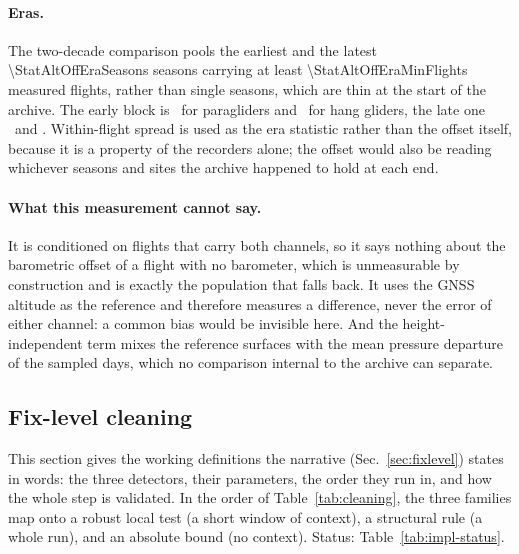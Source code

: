 \begin{revblock}
\paragraph{Eras.} The two-decade comparison pools the earliest and the latest
\num{\StatAltOffEraSeasons} seasons carrying at least
\num{\StatAltOffEraMinFlights} measured flights, rather than single seasons, which
are thin at the start of the archive. The early block is
\StatAltOffParaEraEarlyLabel\ for paragliders and \StatAltOffHangEraEarlyLabel\ for hang
gliders, the late one \StatAltOffParaEraLateLabel\ and \StatAltOffHangEraLateLabel.
Within-flight spread is used as the era statistic rather than the offset itself, because
it is a property of the recorders alone; the offset would also be reading whichever
seasons and sites the archive happened to hold at each end.

\paragraph{What this measurement cannot say.} It is conditioned on flights that carry
both channels, so it says nothing about the barometric offset of a flight with no
barometer, which is unmeasurable by construction and is exactly the population that falls
back. It uses the GNSS altitude as the reference and therefore measures a difference,
never the error of either channel: a common bias would be invisible here. And the
height-independent term mixes the reference surfaces with the mean pressure departure of
the sampled days, which no comparison internal to the archive can separate.
\end{revblock}

\subsection{Fix-level cleaning}
\label{impl:fixlevel}

This section gives the working definitions the narrative (Sec.~\ref{sec:fixlevel}) states in
words: the three detectors, their parameters, the order they run in, and how the whole step
is validated. In the order of Table~\ref{tab:cleaning}, the three families map onto a
robust local test (a short window of context), a structural rule (a whole run), and an
absolute bound (no context). Status: Table~\ref{tab:impl-status}.

